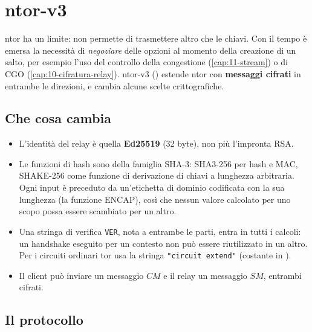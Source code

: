 \section{ntor-v3}\label{sec:ntor3}

ntor ha un limite: non permette di trasmettere altro che le chiavi. Con il tempo è emersa la necessità di \emph{negoziare} delle opzioni al momento della creazione di un salto, per esempio l'uso del controllo della congestione (\cref{cap:11-stream}) o di CGO (\cref{cap:10-cifratura-relay}). ntor-v3 () estende ntor con \textbf{messaggi cifrati} in entrambe le direzioni, e cambia alcune scelte crittografiche.

\subsection{Che cosa cambia}

\begin{itemize}
  \item L'identità del relay è quella \textbf{Ed25519} (32 byte), non più l'impronta RSA.
  \item Le funzioni di hash sono della famiglia SHA-3: SHA3-256 per hash e MAC, SHAKE-256 come funzione di derivazione di chiavi a lunghezza arbitraria. Ogni input è preceduto da un'etichetta di dominio codificata con la sua lunghezza (la funzione $\mathrm{ENCAP}$), così che nessun valore calcolato per uno scopo possa essere scambiato per un altro.
  \item Una stringa di verifica \texttt{VER}, nota a entrambe le parti, entra in tutti i calcoli: un handshake eseguito per un contesto non può essere riutilizzato in un altro. Per i circuiti ordinari tor usa la stringa \texttt{"circuit extend"} (costante  in ).
  \item Il client può inviare un messaggio $CM$ e il relay un messaggio $SM$, entrambi cifrati.
\end{itemize}

\subsection{Il protocollo}

